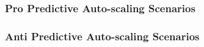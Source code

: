 \subsubsection{Pro Predictive Auto-scaling Scenarios}



\subsubsection{Anti Predictive Auto-scaling Scenarios}


